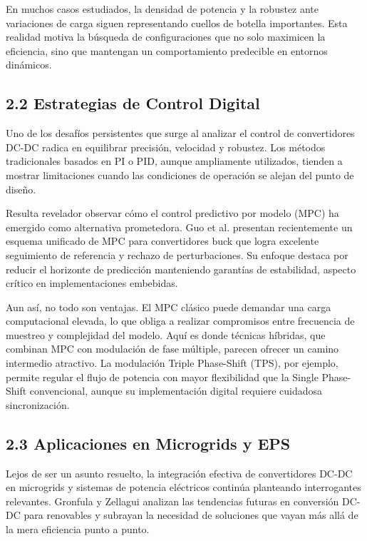 En muchos casos estudiados, la densidad de potencia y la robustez ante variaciones de carga siguen representando cuellos de botella importantes. Esta realidad motiva la búsqueda de configuraciones que no solo maximicen la eficiencia, sino que mantengan un comportamiento predecible en entornos dinámicos.

\subsection{2.2 Estrategias de Control Digital}

Uno de los desafíos persistentes que surge al analizar el control de convertidores DC-DC radica en equilibrar precisión, velocidad y robustez. Los métodos tradicionales basados en PI o PID, aunque ampliamente utilizados, tienden a mostrar limitaciones cuando las condiciones de operación se alejan del punto de diseño.

Resulta revelador observar cómo el control predictivo por modelo (MPC) ha emergido como alternativa prometedora. Guo et al. \cite{Guo2025_MPC} presentan recientemente un esquema unificado de MPC para convertidores buck que logra excelente seguimiento de referencia y rechazo de perturbaciones. Su enfoque destaca por reducir el horizonte de predicción manteniendo garantías de estabilidad, aspecto crítico en implementaciones embebidas.

Aun así, no todo son ventajas. El MPC clásico puede demandar una carga computacional elevada, lo que obliga a realizar compromisos entre frecuencia de muestreo y complejidad del modelo. Aquí es donde técnicas híbridas, que combinan MPC con modulación de fase múltiple, parecen ofrecer un camino intermedio atractivo. La modulación Triple Phase-Shift (TPS), por ejemplo, permite regular el flujo de potencia con mayor flexibilidad que la Single Phase-Shift convencional, aunque su implementación digital requiere cuidadosa sincronización.

\subsection{2.3 Aplicaciones en Microgrids y EPS}

Lejos de ser un asunto resuelto, la integración efectiva de convertidores DC-DC en microgrids y sistemas de potencia eléctricos continúa planteando interrogantes relevantes. Gronfula y Zellagui \cite{Gronfula2025} analizan las tendencias futuras en conversión DC-DC para renovables y subrayan la necesidad de soluciones que vayan más allá de la mera eficiencia punto a punto.

